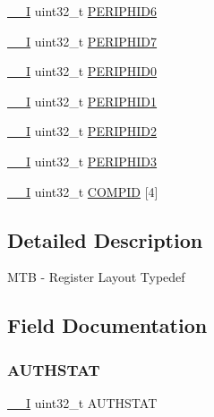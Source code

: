 \begin{DoxyCompactItemize}
\item 
\mbox{\hyperlink{core__cm0plus_8h_af63697ed9952cc71e1225efe205f6cd3}{\+\_\+\+\_\+I}} uint32\+\_\+t \mbox{\hyperlink{struct_m_t_b___type_acd8505982b40f4478a3d82c4e0c884b4}{P\+E\+R\+I\+P\+H\+I\+D6}}
\item 
\mbox{\hyperlink{core__cm0plus_8h_af63697ed9952cc71e1225efe205f6cd3}{\+\_\+\+\_\+I}} uint32\+\_\+t \mbox{\hyperlink{struct_m_t_b___type_ace00880bb4cdd91134d59cd85324c681}{P\+E\+R\+I\+P\+H\+I\+D7}}
\item 
\mbox{\hyperlink{core__cm0plus_8h_af63697ed9952cc71e1225efe205f6cd3}{\+\_\+\+\_\+I}} uint32\+\_\+t \mbox{\hyperlink{struct_m_t_b___type_abccabeeb775d571ffd814f5d21937eab}{P\+E\+R\+I\+P\+H\+I\+D0}}
\item 
\mbox{\hyperlink{core__cm0plus_8h_af63697ed9952cc71e1225efe205f6cd3}{\+\_\+\+\_\+I}} uint32\+\_\+t \mbox{\hyperlink{struct_m_t_b___type_a16ec4a15479493f070d74c29f4e244c5}{P\+E\+R\+I\+P\+H\+I\+D1}}
\item 
\mbox{\hyperlink{core__cm0plus_8h_af63697ed9952cc71e1225efe205f6cd3}{\+\_\+\+\_\+I}} uint32\+\_\+t \mbox{\hyperlink{struct_m_t_b___type_a94da77c610b86d788d32cc8cb6871d23}{P\+E\+R\+I\+P\+H\+I\+D2}}
\item 
\mbox{\hyperlink{core__cm0plus_8h_af63697ed9952cc71e1225efe205f6cd3}{\+\_\+\+\_\+I}} uint32\+\_\+t \mbox{\hyperlink{struct_m_t_b___type_a9ebff4a243ecc983d7f4de875b7669d6}{P\+E\+R\+I\+P\+H\+I\+D3}}
\item 
\mbox{\hyperlink{core__cm0plus_8h_af63697ed9952cc71e1225efe205f6cd3}{\+\_\+\+\_\+I}} uint32\+\_\+t \mbox{\hyperlink{struct_m_t_b___type_af0ce339042860625e784ddae3ef2e2b7}{C\+O\+M\+P\+ID}} \mbox{[}4\mbox{]}
\end{DoxyCompactItemize}


\subsection{Detailed Description}
M\+TB -\/ Register Layout Typedef 

\subsection{Field Documentation}
\mbox{\label{struct_m_t_b___type_a6f9beed9e0ae16bedb9f0681140527fc}} 
\subsubsection{\texorpdfstring{AUTHSTAT}{AUTHSTAT}}
{\footnotesize\ttfamily \mbox{\hyperlink{core__cm0plus_8h_af63697ed9952cc71e1225efe205f6cd3}{\+\_\+\+\_\+I}} uint32\+\_\+t A\+U\+T\+H\+S\+T\+AT}

